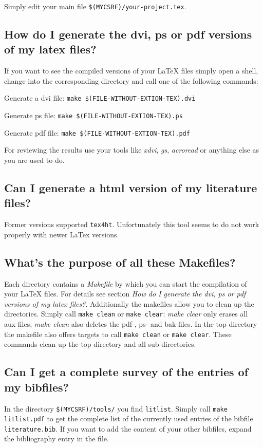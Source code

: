 \documentclass[
  DIV=calc,
  BCOR=5mm,
  11pt,
  headings=small,
  oneside,
  abstract=true,
  toc=bib,
  ngerman,english]{scrartcl}
\begin{document}
Simply edit your main file \texttt{\$(MYCSRF)/your-project.tex}. 

\subsection{How do I generate the dvi, ps or pdf versions of my latex files?}
If you want to see the compiled versions of your LaTeX files simply open a
shell, change into the corresponding directory and call one of the following
commands:

\begin{description} 
\item Generate a dvi file: \texttt{make \$(FILE-WITHOUT-EXTION-TEX).dvi}
\item Generate ps file: \texttt{make \$(FILE-WITHOUT-EXTION-TEX).ps} 
\item Generate pdf file: \texttt{make \$(FILE-WITHOUT-EXTION-TEX).pdf}
\end{description}

For reviewing the results use your tools like \textit{xdvi}, \textit{gs},
\textit{acroread} or anything else as you are used to do.

\subsection{Can I generate a html version of my literature files?}
Former versions supported \texttt{tex4ht}. Unfortunately this tool
seems to do not work properly with newer LaTex versions.

\subsection{What's the purpose of all these Makefiles?}
Each directory contains a \textit{Makefile} by which you can start the
compilation of your LaTeX files. For details see section \textit{How do I
generate the dvi, ps or pdf versions of my latex files?}. Additionally the
makefiles allow you to clean up the directories. Simply call \texttt{make clean}
or \texttt{make clear}: \textit{make clear} only erases all aux-files,
\textit{make clean} also deletes the pdf-, ps- and bak-files. In the top
directory the makefile also offers targets to call \texttt{make
clean} or \texttt{make clear}. These commands clean up the top directory and
all sub-directories.

\subsection{Can I get a complete survey of the entries of my bibfiles?}
In the directory \texttt{\$(MYCSRF)/tools/} you find \texttt{litlist}. 
Simply call \texttt{make litlist.pdf} to get the complete list of the
currently used entries of the bibfile \texttt{literature.bib}. If you
want to add the content of your other bibfiles, expand the bibliography
entry in the file.
\end{document}
